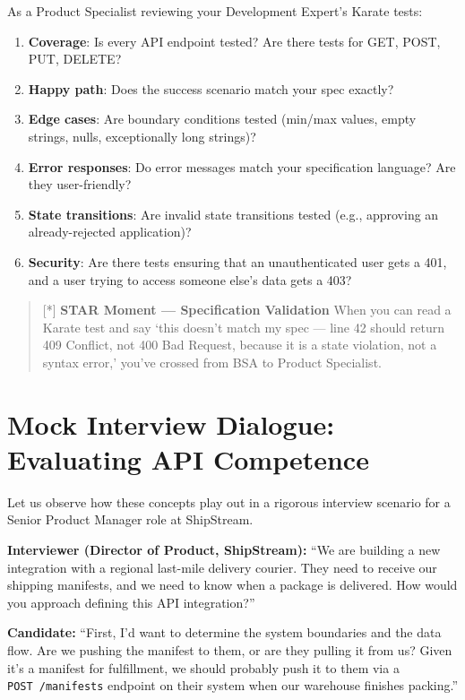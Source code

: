 As a Product Specialist reviewing your Development Expert's Karate
tests:

\begin{enumerate}
\def\labelenumi{\arabic{enumi}.}
\tightlist
\item
  \textbf{Coverage}: Is every API endpoint tested? Are there tests for
  GET, POST, PUT, DELETE?
\item
  \textbf{Happy path}: Does the success scenario match your spec
  exactly?
\item
  \textbf{Edge cases}: Are boundary conditions tested (min/max values,
  empty strings, nulls, exceptionally long strings)?
\item
  \textbf{Error responses}: Do error messages match your specification
  language? Are they user-friendly?
\item
  \textbf{State transitions}: Are invalid state transitions tested
  (e.g., approving an already-rejected application)?
\item
  \textbf{Security}: Are there tests ensuring that an unauthenticated
  user gets a 401, and a user trying to access someone else's data gets
  a 403?
\end{enumerate}

\begin{quote}
{[}*{]} \textbf{STAR Moment --- Specification Validation} When you can
read a Karate test and say `this doesn't match my spec --- line 42
should return 409 Conflict, not 400 Bad Request, because it is a state
violation, not a syntax error,' you've crossed from BSA to Product
Specialist.
\end{quote}

\section{Mock Interview Dialogue: Evaluating API
Competence}\label{mock-interview-dialogue-evaluating-api-competence}

Let us observe how these concepts play out in a rigorous interview
scenario for a Senior Product Manager role at ShipStream.

\textbf{Interviewer (Director of Product, ShipStream):} ``We are
building a new integration with a regional last-mile delivery courier.
They need to receive our shipping manifests, and we need to know when a
package is delivered. How would you approach defining this API
integration?''

\textbf{Candidate:} ``First, I'd want to determine the system boundaries
and the data flow. Are we pushing the manifest to them, or are they
pulling it from us? Given it's a manifest for fulfillment, we should
probably push it to them via a \texttt{POST\ /manifests} endpoint on
their system when our warehouse finishes packing.''

